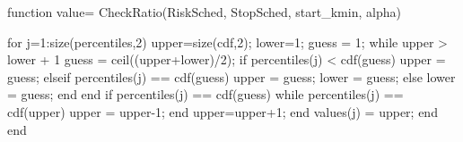 function value= CheckRatio(RiskSched, StopSched, start_kmin, alpha)
    
    for j=1:size(percentiles,2)
        upper=size(cdf,2);
        lower=1;
        guess = 1;
        while upper > lower + 1
            guess = ceil((upper+lower)/2);
            if percentiles(j) < cdf(guess)
                upper = guess;
            elseif percentiles(j) == cdf(guess)
                upper = guess;
                lower = guess;
            else
                lower = guess;
            end
        end
        if percentiles(j) == cdf(guess)
            while percentiles(j) == cdf(upper)
                upper = upper-1;
            end
                upper=upper+1;
        end
        values(j) = upper;
    end       
end


